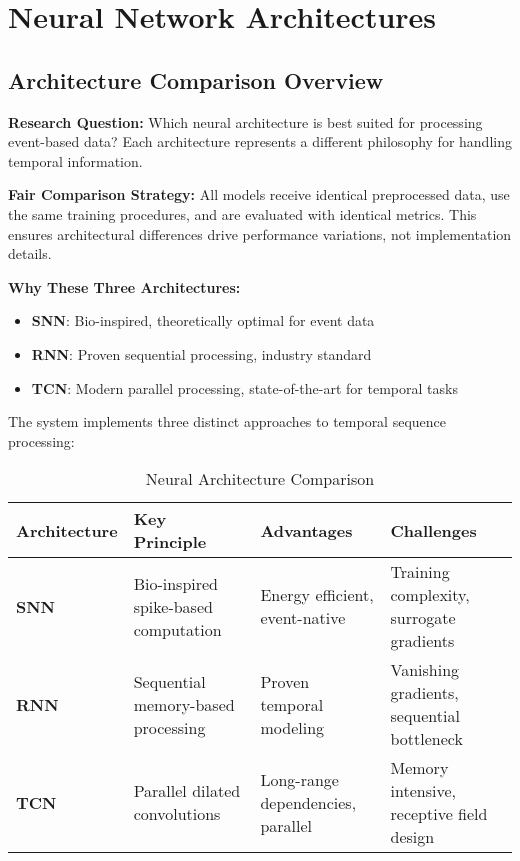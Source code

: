\documentclass[12pt,a4paper]{article}
\begin{document}
\section{Neural Network Architectures}

\subsection{Architecture Comparison Overview}

\textbf{Research Question:} Which neural architecture is best suited for processing event-based data? Each architecture represents a different philosophy for handling temporal information.

\textbf{Fair Comparison Strategy:} All models receive identical preprocessed data, use the same training procedures, and are evaluated with identical metrics. This ensures architectural differences drive performance variations, not implementation details.

\textbf{Why These Three Architectures:}
\begin{itemize}
    \item \textbf{SNN}: Bio-inspired, theoretically optimal for event data
    \item \textbf{RNN}: Proven sequential processing, industry standard
    \item \textbf{TCN}: Modern parallel processing, state-of-the-art for temporal tasks
\end{itemize}

The system implements three distinct approaches to temporal sequence processing:

\begin{table}[H]
\centering
\begin{tabular}{|l|p{4cm}|p{4cm}|p{4cm}|}
\hline
\textbf{Architecture} & \textbf{Key Principle} & \textbf{Advantages} & \textbf{Challenges} \\
\hline
\textbf{SNN} & Bio-inspired spike-based computation & Energy efficient, event-native & Training complexity, surrogate gradients \\
\hline
\textbf{RNN} & Sequential memory-based processing & Proven temporal modeling & Vanishing gradients, sequential bottleneck \\
\hline
\textbf{TCN} & Parallel dilated convolutions & Long-range dependencies, parallel & Memory intensive, receptive field design \\
\hline
\end{tabular}
\caption{Neural Architecture Comparison}
\end{table}
\end{document}
